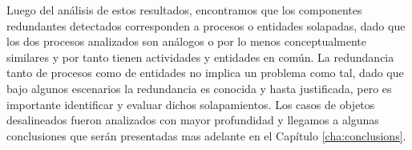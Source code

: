 \begin{table}
\begin{center}
\end{center}
\caption{Resultados de Evaluar Heur\'isticas de Desalineaci\'on}
\label{tab:alignmentAB}
\end{table}

Luego del an\'alisis de estos resultados, encontramos que los componentes redundantes detectados corresponden a procesos o entidades solapadas, dado que los dos procesos analizados son an\'alogos o por lo menos conceptualmente similares y por tanto tienen actividades y entidades en com\'un. La redundancia tanto de procesos como de entidades no implica un problema como tal, dado que bajo algunos escenarios la redundancia es conocida y hasta justificada, pero es importante identificar y evaluar dichos solapamientos. Los casos de objetos desalineados fueron analizados con mayor profundidad y llegamos a algunas conclusiones que ser\'an presentadas mas adelante en el Cap\'itulo \ref{cha:conclusions}.

